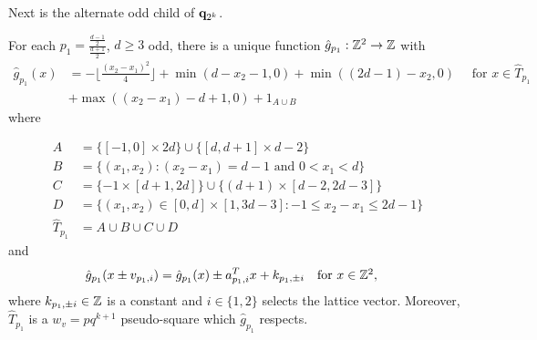 \documentclass[12pt]{amsart}
\begin{document}
Next is the alternate odd child of $\mathbf{q}_{2^k}$. 
\begin{lemma} \label{lemma:basecase_2k_odd_alt}
	For each $p_1 = \frac{\frac{d-1}{2}}{\frac{d+1}{2}}$, $d \geq 3$ odd, there is a unique function $\hat{g}_{p_1}: \mathbb{Z}^2 \to \mathbb{Z}$ with 
	\begin{align*}
	\hat{g}_{p_1}(x) &= -\lfloor \frac{(x_2-x_1)^2}{4} \rfloor + \min(d-x_2-1,0) + \min((2d-1)-x_2,0)  \quad \mbox{ for $x \in \hat{T}_{p_1}$} \\
	&+ \max((x_2-x_1)-d+1, 0) + 1_{A \cup B} 
	\end{align*}
	where
	
	\begin{align*}
	A &= \{[-1,0] \times 2 d   \} \cup \{ [d,d+1] \times d-2 \} \\
	B &=  \{ (x_1,x_2) :  (x_2-x_1) = d-1 \mbox{ and } 0 < x_1 < d \}    \\ 
	C &= \{  -1 \times [d+1,2d] \} \cup \{ (d+1) \times [d-2,2d-3]\} \\ 
	D &=  \{ (x_1, x_2) \in [0, d] \times [1, 3d-3]:  -1 \leq x_2-x_1 \leq 2d-1 \}  \\ %
	\hat{T}_{p_1} &=  A \cup B \cup C \cup D
	\end{align*}
	and
	\[
	\begin{aligned}
	\hat{g}_{p_1}(x \pm v_{p_1,i}) &= \hat{g}_{p_1}(x) \pm a_{p_1,i}^T x + k_{p_1,\pm i}  \quad \mbox{for $x \in \mathbb{Z}^2$},
	\end{aligned}
	\]
	where $k_{p_1,\pm i} \in \mathbb{Z}$ is a constant and $i \in \{1,2\}$ selects the lattice vector.
	Moreover, $\hat{T}_{p_1}$ is a $w_v = p q^{k+1}$ pseudo-square which $\hat{g}_{p_1}$ respects. 
\end{lemma}
\end{document}
